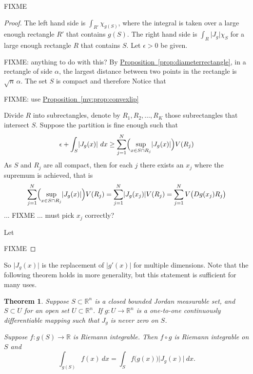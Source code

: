 \documentclass[12pt]{book}
\newcommand{\sabs}[1]{\lvert {#1} \rvert}
\newcommand{\R}{{\mathbb{R}}}
\theoremstyle{plain}
\newtheorem{thm}{Theorem}[section]
\theoremstyle{remark}
\theoremstyle{definition}
\theoremstyle{exercise}
\theoremstyle{example}
\newcommand{\propref}[1]{\hyperref[#1]{Proposition~\ref*{#1}}}
\begin{document}
FIXME

\begin{proof}
The left hand side is $\int_{R'} \chi_{g(S)}$, where the integral is taken over a
large enough rectangle $R'$ that contains $g(S)$.
The right hand side is $\int_{R} \sabs{J_g} \chi_S$ for
a large enough rectangle $R$ that contains $S$.  Let $\epsilon > 0$ be
given.

FIXME: anything to do with this?
By \propref{prop:diameterrectangle},
in a rectangle of side $\alpha$, the largest distance 
between two points in the rectangle is $\sqrt{n} \, \alpha$.
The set $S$ is compact and therefore 
Notice that 

FIXME: use
\propref{mv:prop:convexlip}





Divide $R$ into
subrectangles, denote
by $R_1,R_2,\ldots,R_K$ those subrectangles that intersect $S$.
Suppose the partition is fine enough such that
\begin{equation*}
\epsilon + \int_S \sabs{J_g(x)} ~ dx \geq
\sum_{j=1}^N \Bigl(\sup_{x \in S \cap R_j} \sabs{J_g(x)} \Bigr) V(R_j)
\end{equation*}
As $S$ and $R_j$ are all compact, then for each $j$ there exists an $x_j$
where the supremum is achieved, that is
\begin{equation*}
\sum_{j=1}^N \Bigl(\sup_{x \in S \cap R_j} \sabs{J_g(x)} \Bigr) V(R_j)
=
\sum_{j=1}^N \sabs{J_g(x_j)}  V(R_j)
=
\sum_{j=1}^N V\bigl(Dg(x_j) R_j\bigr)
\end{equation*}
... FIXME ... must pick $x_j$ correctly?




Let 






FIXME
\end{proof}

So $\sabs{J_g(x)}$ is the replacement of $\sabs{g'(x)}$ for multiple
dimensions.  Note that the following theorem holds in more generality,
but this statement is sufficient for many uses.

\begin{thm}
Suppose $S \subset \R^n$ is a closed bounded Jordan measurable set,
and $S \subset U$ for an open set $U \subset \R^n$.  If
$g \colon U \to \R^n$ is a one-to-one
continuously differentiable mapping such that
$J_g$ is never zero on $S$.

Suppose $f \colon g(S) \to \R$ is Riemann
integrable.  Then $f \circ g$ is Riemann integrable on $S$ and
\begin{equation*}
\int_{g(S)} f(x) ~ dx = 
\int_S f\bigl(g(x)\bigr) \sabs{J_g(x)} ~ dx .
\end{equation*}
\end{thm}
\end{document}
